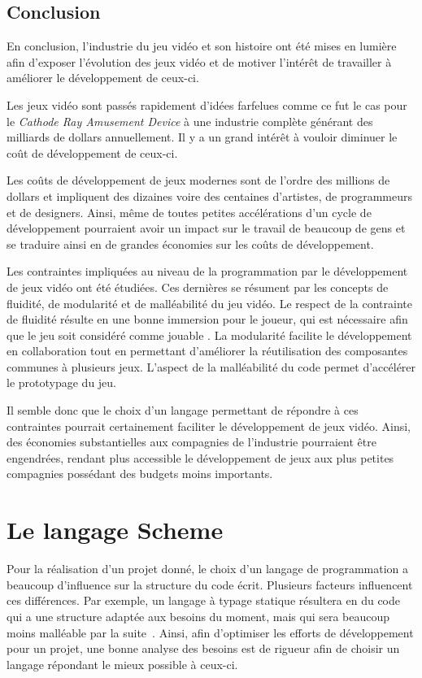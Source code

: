 \documentclass[12pt,twoside,letterpaper,francais]{book}
\begin{document}
\FloatBarrier
\section{Conclusion}
En conclusion, l'industrie du jeu vidéo et son histoire ont été mises
en lumière afin d'exposer l'évolution des jeux vidéo et de motiver
l'intérêt de travailler à améliorer le dévelop\-pement de ceux-ci.

Les jeux vidéo sont passés rapidement d'idées farfelues comme ce fut
le cas pour le \textit{Cathode Ray Amusement Device} à une industrie
complète générant des milliards de dollars annuellement. Il y a un
grand intérêt à vouloir diminuer le coût de dévelop\-pement de
ceux-ci. 

Les coûts de dévelop\-pement de jeux modernes sont de l'ordre des
millions de dollars et impliquent des dizaines voire des centaines
d'artistes, de programmeurs et de designers. Ainsi, même de toutes
petites accélérations d'un cycle de dévelop\-pement pourraient avoir
un impact sur le travail de beaucoup de gens et se traduire ainsi en
de grandes économies sur les coûts de dévelop\-pement.

Les contraintes impliquées au niveau de la programmation par le
dévelop\-pement de jeux vidéo ont été étudiées. Ces dernières se
résument par les concepts de fluidité, de modularité et de
malléabilité du jeu vidéo. Le respect de la contrainte de fluidité
résulte en une bonne immersion pour le joueur, qui est nécessaire afin
que le jeu soit considéré comme \og jouable \fg. La modularité
facilite le dévelop\-pement en collaboration tout en permettant
d'améliorer la réutilisation des composantes communes à plusieurs
jeux. L'aspect de la malléabilité du code permet d'accélérer le
prototypage du jeu.

Il semble donc que le choix d'un langage permettant de répondre à ces
contraintes pourrait certainement faciliter le dévelop\-pement de jeux
vidéo. Ainsi, des économies substantielles aux compagnies de
l'industrie pourraient être engendrées, rendant plus accessible le
dévelop\-pement de jeux aux plus petites compagnies possédant des
budgets moins importants.


\clearpage

\chapter{Le langage Scheme} \label{Chap:Scheme}
Pour la réalisation d'un projet donné, le choix d'un langage de
programmation a beaucoup d'influence sur la structure du code
écrit. Plusieurs facteurs influencent ces différences. Par exemple, un
langage à typage statique résultera en du code qui a une structure
adaptée aux besoins du moment, mais qui sera beaucoup moins malléable
par la suite~\cite{StaticVSDynamic}. Ainsi, afin d'optimiser les
efforts de dévelop\-pement pour un projet, une bonne analyse des
besoins est de rigueur afin de choisir un langage répondant le mieux
possible à ceux-ci.
\end{document}
